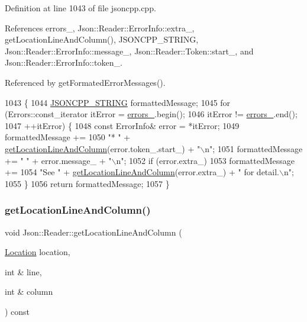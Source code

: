 Definition at line 1043 of file jsoncpp.\+cpp.



References errors\+\_\+, Json\+::\+Reader\+::\+Error\+Info\+::extra\+\_\+, get\+Location\+Line\+And\+Column(), J\+S\+O\+N\+C\+P\+P\+\_\+\+S\+T\+R\+I\+NG, Json\+::\+Reader\+::\+Error\+Info\+::message\+\_\+, Json\+::\+Reader\+::\+Token\+::start\+\_\+, and Json\+::\+Reader\+::\+Error\+Info\+::token\+\_\+.



Referenced by get\+Formated\+Error\+Messages().


\begin{DoxyCode}
1043                                                        \{
1044   \hyperlink{json_8h_a1e723f95759de062585bc4a8fd3fa4be}{JSONCPP\_STRING} formattedMessage;
1045   \textcolor{keywordflow}{for} (Errors::const\_iterator itError = \hyperlink{class_json_1_1_reader_a1bbce45dc4df753bed60c129f4b5147c}{errors\_}.begin();
1046        itError != \hyperlink{class_json_1_1_reader_a1bbce45dc4df753bed60c129f4b5147c}{errors\_}.end();
1047        ++itError) \{
1048     \textcolor{keyword}{const} ErrorInfo& error = *itError;
1049     formattedMessage +=
1050         \textcolor{stringliteral}{"* "} + \hyperlink{class_json_1_1_reader_a8b2fb6af24382c3914fd4643b092c675}{getLocationLineAndColumn}(error.token\_.start\_) + \textcolor{stringliteral}{"\(\backslash\)n"};
1051     formattedMessage += \textcolor{stringliteral}{"  "} + error.message\_ + \textcolor{stringliteral}{"\(\backslash\)n"};
1052     \textcolor{keywordflow}{if} (error.extra\_)
1053       formattedMessage +=
1054           \textcolor{stringliteral}{"See "} + \hyperlink{class_json_1_1_reader_a8b2fb6af24382c3914fd4643b092c675}{getLocationLineAndColumn}(error.extra\_) + \textcolor{stringliteral}{" for detail.\(\backslash\)n"};
1055   \}
1056   \textcolor{keywordflow}{return} formattedMessage;
1057 \}
\end{DoxyCode}
\mbox{\label{class_json_1_1_reader_a8b2fb6af24382c3914fd4643b092c675}} 
\subsubsection{\texorpdfstring{get\+Location\+Line\+And\+Column()}{getLocationLineAndColumn()}\hspace{0.1cm}{\footnotesize\ttfamily [1/2]}}
{\footnotesize\ttfamily void Json\+::\+Reader\+::get\+Location\+Line\+And\+Column (\begin{DoxyParamCaption}\item[{\hyperlink{class_json_1_1_reader_a46795b5b272bf79a7730e406cb96375a}{Location}}]{location,  }\item[{int \&}]{line,  }\item[{int \&}]{column }\end{DoxyParamCaption}) const\hspace{0.3cm}{\ttfamily [private]}}



